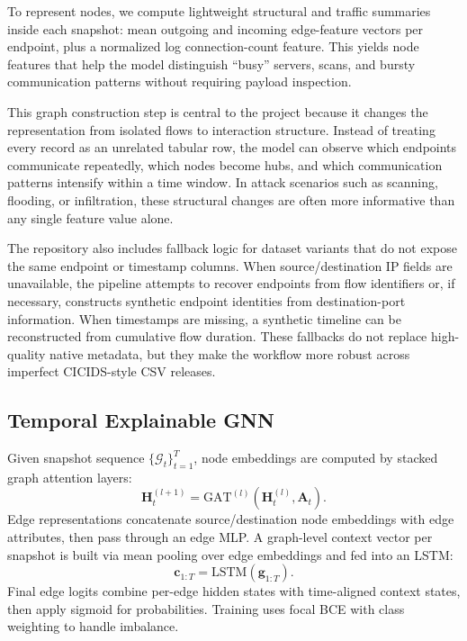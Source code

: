 \documentclass[conference]{IEEEtran}
\begin{document}
To represent nodes, we compute lightweight structural and traffic summaries inside each snapshot: mean outgoing and incoming edge-feature vectors per endpoint, plus a normalized log connection-count feature. This yields node features that help the model distinguish ``busy'' servers, scans, and bursty communication patterns without requiring payload inspection.

This graph construction step is central to the project because it changes the representation from isolated flows to interaction structure. Instead of treating every record as an unrelated tabular row, the model can observe which endpoints communicate repeatedly, which nodes become hubs, and which communication patterns intensify within a time window. In attack scenarios such as scanning, flooding, or infiltration, these structural changes are often more informative than any single feature value alone.

The repository also includes fallback logic for dataset variants that do not expose the same endpoint or timestamp columns. When source/destination IP fields are unavailable, the pipeline attempts to recover endpoints from flow identifiers or, if necessary, constructs synthetic endpoint identities from destination-port information. When timestamps are missing, a synthetic timeline can be reconstructed from cumulative flow duration. These fallbacks do not replace high-quality native metadata, but they make the workflow more robust across imperfect CICIDS-style CSV releases.

\subsection{Temporal Explainable GNN}
Given snapshot sequence $\{\mathcal{G}_t\}_{t=1}^{T}$, node embeddings are computed by stacked graph attention layers:
\begin{equation}
\mathbf{H}_t^{(l+1)} = \mathrm{GAT}^{(l)}(\mathbf{H}_t^{(l)}, \mathbf{A}_t).
\end{equation}
Edge representations concatenate source/destination node embeddings with edge attributes, then pass through an edge MLP. A graph-level context vector per snapshot is built via mean pooling over edge embeddings and fed into an LSTM:
\begin{equation}
\mathbf{c}_{1:T} = \mathrm{LSTM}(\mathbf{g}_{1:T}).
\end{equation}
Final edge logits combine per-edge hidden states with time-aligned context states, then apply sigmoid for probabilities. Training uses focal BCE with class weighting to handle imbalance.
\end{document}
